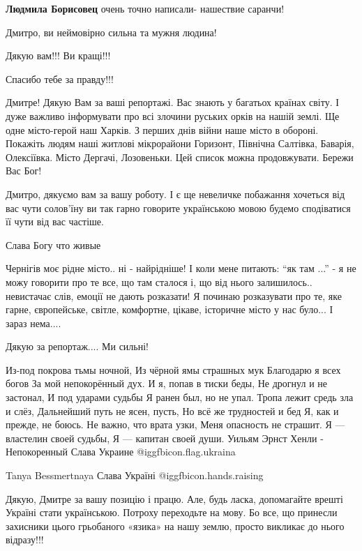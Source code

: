 \begin{itemize}
\textbf{Людмила Борисовец} очень точно написали- нашествие саранчи!

Дмитро, ви неймовірно сильна та мужня людина!

Дякую вам!!!
Ви кращі!!!

Спасибо тебе за правду!!!


Дмитре! Дякую Вам за ваші репортажі. Вас знають у багатьох країнах світу. І
дуже важливо інформувати про всі злочини руських орків на нашій землі. Ще одне
місто-герой наш Харків. З перших днів війни наше місто в обороні. Покажіть
людям наші житлові мікрорайони Горизонт, Північна Салтівка, Баварія,
Олексіївка. Місто Дергачі, Лозовеньки. Цей список можна продовжувати. Бережи
Вас Бог!


Дмитро, дякуємо вам за вашу роботу. І є ще невеличке побажання хочеться від вас
чути солов'їну ви так гарно говорите українською мовою будемо сподіватися її
чути від вас частіше.

Слава Богу что живые


Чернігів моє рідне місто.. ні - найрідніше! І коли мене питають: \enquote{як там ...} -
я не можу говорити про те все, що там сталося і, що від нього залишилось..
невистачає слів, емоції не дають розказати! Я починаю розказувати про те, яке
гарне, європейське, світле, комфортне, цікаве, історичне місто у нас було... І
зараз нема....

Дякую за репортаж.... Ми сильні!


\obeycr
Из-под покрова тьмы ночной,
Из чёрной ямы страшных мук
Благодарю я всех богов
За мой непокорённый дух.
И я, попав в тиски беды,
Не дрогнул и не застонал,
И под ударами судьбы
Я ранен был, но не упал.
Тропа лежит средь зла и слёз,
Дальнейший путь не ясен, пусть,
Но всё же трудностей и бед
Я, как и прежде, не боюсь.
Не важно, что врата узки,
Меня опасность не страшит.
Я — властелин своей судьбы,
Я — капитан своей души.
Уильям Эрнст Хенли - Непокоренный
Слава Украине @igg{fbicon.flag.ukraina}

Tanya Bessmertnaya
Слава Україні  @igg{fbicon.hands.raising} 
\restorecr


Дякую, Дмитре за вашу позицію і працю. Але, будь ласка, допомагайте врешті
Україні стати українською. Потроху переходьте на мову. Бо все, що принесли
захисники цього грьобаного «язика» на нашу землю, просто викликає до нього
відразу!!!


\end{itemize}
